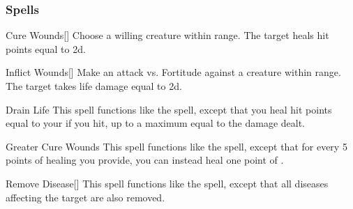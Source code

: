 \subsubsection{Spells}


\lowercase{\hypertarget{spell:Cure Wounds}{}}\label{spell:Cure Wounds}
\begin{ability}[\nth{1}]{\hypertarget{spell:Cure Wounds}{Cure Wounds}}[]
Choose a willing creature within \rngmed range.
The target heals hit points equal to  \plus2d.
\end{ability}
\vspace{0.25em}



\lowercase{\hypertarget{spell:Inflict Wounds}{}}\label{spell:Inflict Wounds}
\begin{ability}[\nth{1}]{\hypertarget{spell:Inflict Wounds}{Inflict Wounds}}[]
Make an attack vs. Fortitude against a creature within \rngmed range.
\hit The target takes life damage equal to  \plus2d.
\end{ability}
\vspace{0.25em}



\lowercase{\hypertarget{spell:Drain Life}{}}\label{spell:Drain Life}
\begin{ability}[\nth{2}]{\hypertarget{spell:Drain Life}{Drain Life}}
This spell functions like the  spell, except that you heal hit points equal to your  if you hit, up to a maximum equal to the damage dealt.
\end{ability}
\vspace{0.25em}



\lowercase{\hypertarget{spell:Greater Cure Wounds}{}}\label{spell:Greater Cure Wounds}
\begin{ability}[\nth{2}]{\hypertarget{spell:Greater Cure Wounds}{Greater Cure Wounds}}
This spell functions like the  spell, except that for every 5 points of healing you provide, you can instead heal one point of .
\end{ability}
\vspace{0.25em}



\lowercase{\hypertarget{spell:Remove Disease}{}}\label{spell:Remove Disease}
\begin{ability}[\nth{2}]{\hypertarget{spell:Remove Disease}{Remove Disease}}[]
This spell functions like the  spell, except that all diseases affecting the target are also removed.
\end{ability}
\vspace{0.25em}



